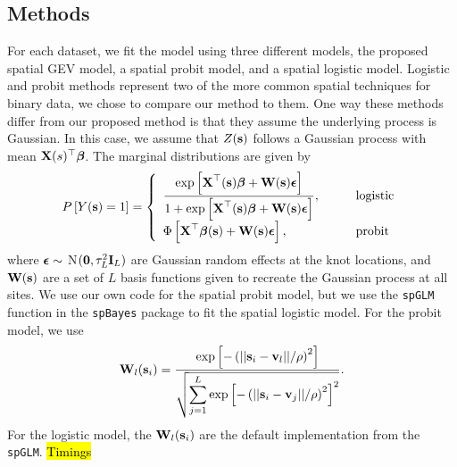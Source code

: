 \documentclass[11pt]{article}
\begin{document}
\subsection{Methods} \label{rbs:methods}
For each dataset, we fit the model using three different models, the proposed spatial GEV model, a spatial probit model, and a spatial logistic model.
Logistic and probit methods represent two of the more common spatial techniques for binary data, we chose to compare our method to them.
One way these methods differ from our proposed method is that they assume the underlying process is Gaussian.
In this case, we assume that $Z(\mbox{\bf s})$ follows a Gaussian process with mean $\mbox{\bf X}(s)^\top \mbox{\boldmath $\beta$}$.
The marginal distributions are given by
\begin{align}
  P\left[Y(\mbox{\bf s}) = 1\right] = \left\{ \begin{array}{ll}
    \displaystyle \frac{\exp\left[\mbox{\bf X}^\top(\mbox{\bf s}) \mbox{\boldmath $\beta$} + \mbox{\bf W} (\mbox{\bf s}) \mbox{\boldmath $\epsilon$} \right]}{1 + \exp\left[\mbox{\bf X}^\top(\mbox{\bf s}) \mbox{\boldmath $\beta$} + \mbox{\bf W} (\mbox{\bf s}) \mbox{\boldmath $\epsilon$} \right]}, \qquad &\text{logistic}\\
    \Phi\left[\mbox{\bf X}^\top \mbox{\boldmath $\beta$} (\mbox{\bf s}) + \mbox{\bf W} (\mbox{\bf s}) \mbox{\boldmath $\epsilon$} \right], \qquad &\text{probit}
  \end{array}\right.
\end{align}
where $\mbox{\boldmath $\epsilon$} \sim$ N$(\mbox{\boldmath $0$}, \tau^2_L \mbox{\bf I}_L)$ are Gaussian random effects at the knot locations, and $\mbox{\bf W}(\mbox{\bf s})$ are a set of $L$ basis functions given to recreate the Gaussian process at all sites.
We use our own code for the spatial probit model, but we use the \texttt{spGLM} function in the \texttt{spBayes} package \citep{Finley2015} to fit the spatial logistic model.
For the probit model, we use
\begin{align}
  \mbox{\bf W}_l(\mbox{\bf s}_i) = \frac{\exp\left[-\left(||\mbox{\bf s}_i-\mbox{\bf v}_l||/\rho\right)^2\right]}
                 {\sqrt{\displaystyle \sum_{j=1}^L\exp\left[-\left(||\mbox{\bf s}_i-\mbox{\bf v}_j||/\rho\right)^2\right]^2}}.
\end{align}
For the logistic model, the $\mbox{\bf W}_l(\mbox{\bf s}_i)$ are the default implementation from the \texttt{spGLM}.
\hl{Timings}
\end{document}
